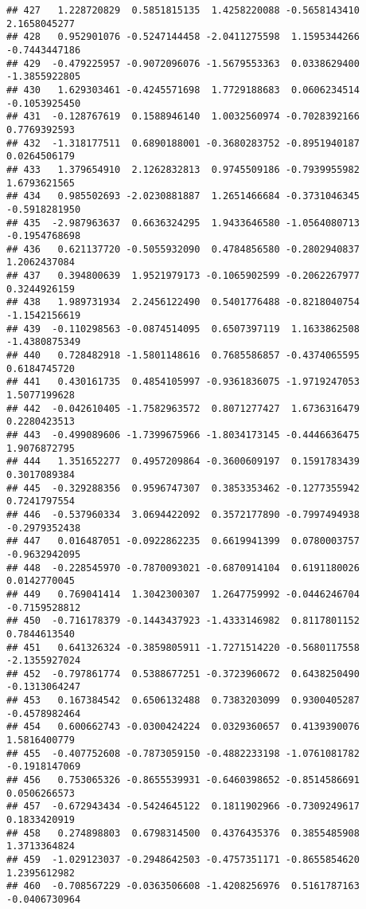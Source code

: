 \documentclass[
]{article}
\begin{document}
\begin{verbatim}
## 427   1.228720829  0.5851815135  1.4258220088 -0.5658143410  2.1658045277
## 428   0.952901076 -0.5247144458 -2.0411275598  1.1595344266 -0.7443447186
## 429  -0.479225957 -0.9072096076 -1.5679553363  0.0338629400 -1.3855922805
## 430   1.629303461 -0.4245571698  1.7729188683  0.0606234514 -0.1053925450
## 431  -0.128767619  0.1588946140  1.0032560974 -0.7028392166  0.7769392593
## 432  -1.318177511  0.6890188001 -0.3680283752 -0.8951940187  0.0264506179
## 433   1.379654910  2.1262832813  0.9745509186 -0.7939955982  1.6793621565
## 434   0.985502693 -2.0230881887  1.2651466684 -0.3731046345 -0.5918281950
## 435  -2.987963637  0.6636324295  1.9433646580 -1.0564080713 -0.1954768698
## 436   0.621137720 -0.5055932090  0.4784856580 -0.2802940837  1.2062437084
## 437   0.394800639  1.9521979173 -0.1065902599 -0.2062267977  0.3244926159
## 438   1.989731934  2.2456122490  0.5401776488 -0.8218040754 -1.1542156619
## 439  -0.110298563 -0.0874514095  0.6507397119  1.1633862508 -1.4380875349
## 440   0.728482918 -1.5801148616  0.7685586857 -0.4374065595  0.6184745720
## 441   0.430161735  0.4854105997 -0.9361836075 -1.9719247053  1.5077199628
## 442  -0.042610405 -1.7582963572  0.8071277427  1.6736316479  0.2280423513
## 443  -0.499089606 -1.7399675966 -1.8034173145 -0.4446636475  1.9076872795
## 444   1.351652277  0.4957209864 -0.3600609197  0.1591783439  0.3017089384
## 445  -0.329288356  0.9596747307  0.3853353462 -0.1277355942  0.7241797554
## 446  -0.537960334  3.0694422092  0.3572177890 -0.7997494938 -0.2979352438
## 447   0.016487051 -0.0922862235  0.6619941399  0.0780003757 -0.9632942095
## 448  -0.228545970 -0.7870093021 -0.6870914104  0.6191180026  0.0142770045
## 449   0.769041414  1.3042300307  1.2647759992 -0.0446246704 -0.7159528812
## 450  -0.716178379 -0.1443437923 -1.4333146982  0.8117801152  0.7844613540
## 451   0.641326324 -0.3859805911 -1.7271514220 -0.5680117558 -2.1355927024
## 452  -0.797861774  0.5388677251 -0.3723960672  0.6438250490 -0.1313064247
## 453   0.167384542  0.6506132488  0.7383203099  0.9300405287 -0.4578982464
## 454   0.600662743 -0.0300424224  0.0329360657  0.4139390076  1.5816400779
## 455  -0.407752608 -0.7873059150 -0.4882233198 -1.0761081782 -0.1918147069
## 456   0.753065326 -0.8655539931 -0.6460398652 -0.8514586691  0.0506266573
## 457  -0.672943434 -0.5424645122  0.1811902966 -0.7309249617  0.1833420919
## 458   0.274898803  0.6798314500  0.4376435376  0.3855485908  1.3713364824
## 459  -1.029123037 -0.2948642503 -0.4757351171 -0.8655854620  1.2395612982
## 460  -0.708567229 -0.0363506608 -1.4208256976  0.5161787163 -0.0406730964

\end{verbatim}
\end{document}
